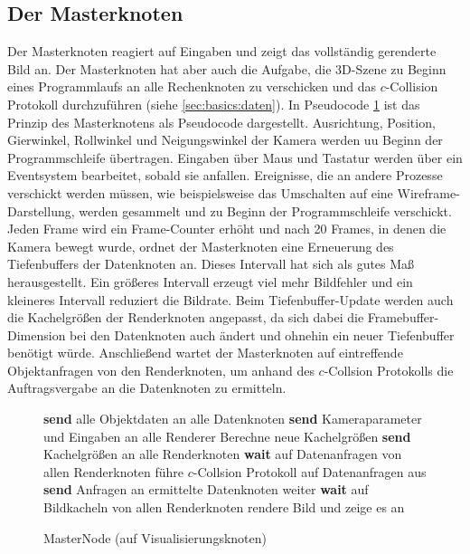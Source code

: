 \subsection{Der Masterknoten}
\label{sec:impl:master}
Der Masterknoten reagiert auf Eingaben und zeigt das vollständig gerenderte Bild an. Der Masterknoten hat aber auch die Aufgabe, die 3D-Szene zu Beginn eines Programmlaufs an alle Rechenknoten zu verschicken und das $c$-Collision Protokoll durchzuführen (siehe \ref{sec:basics:daten}). In Pseudocode \ref{alg:impl:masternode} ist das Prinzip des Masterknotens als Pseudocode dargestellt. Ausrichtung, Position, Gierwinkel, Rollwinkel und Neigungswinkel der Kamera werden uu Beginn der Programmschleife übertragen. Eingaben über Maus und Tastatur werden über ein Eventsystem bearbeitet, sobald sie anfallen. Ereignisse, die an andere Prozesse verschickt werden müssen, wie beispielsweise das Umschalten auf eine Wireframe-Darstellung, werden gesammelt und zu Beginn der Programmschleife verschickt. Jeden Frame wird ein Frame-Counter erhöht und nach 20 Frames, in denen die Kamera bewegt wurde, ordnet der Masterknoten eine Erneuerung des Tiefenbuffers der Datenknoten an. Dieses Intervall hat sich als gutes Maß herausgestellt. Ein größeres Intervall erzeugt viel mehr Bildfehler und ein kleineres Intervall reduziert die Bildrate. Beim Tiefenbuffer-Update werden auch die Kachelgrößen der Renderknoten angepasst, da sich dabei die Framebuffer-Dimension bei den Datenknoten auch ändert und ohnehin ein neuer Tiefenbuffer benötigt würde. Anschließend wartet der Masterknoten auf eintreffende Objektanfragen von den Renderknoten, um anhand des $c$-Collsion Protokolls die Auftragsvergabe an die Datenknoten zu ermitteln.
\begin{figure}[ttt!]
\centering
 \begin{minipage}[t]{12cm}
\begin{algorithm}[H]
  \caption{MasterNode (auf Visualisierungsknoten)\label{alg:impl:masternode}} 
    \begin{algorithmic} [1]
      \STATE \textbf{send} alle Objektdaten an alle Datenknoten
      \LOOP
	\STATE \textbf{send} Kameraparameter und Eingaben an alle Renderer
	  \STATE Berechne neue Kachelgrößen
	  \STATE \textbf{send} Kachelgrößen an alle Renderknoten
	\ENDIF
	\STATE \textbf{wait} auf Datenanfragen von allen Renderknoten
	\STATE führe $c$-Collsion Protokoll auf Datenanfragen aus
	\STATE \textbf{send} Anfragen an ermittelte Datenknoten weiter
	\STATE \textbf{wait} auf Bildkacheln von allen Renderknoten
	\STATE rendere Bild und zeige es an
      \ENDLOOP
    \end{algorithmic}
\end{algorithm}
 \end{minipage}
\end{figure}

